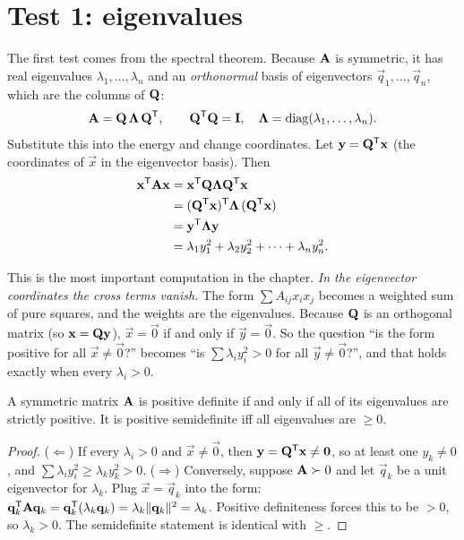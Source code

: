\section{Test 1: eigenvalues}

The first test comes from the spectral theorem. Because $\mathbf{A}$ is symmetric, it has real
eigenvalues $\lambda_1, \dots, \lambda_n$ and an \emph{orthonormal} basis of eigenvectors
$\vec{q}_1, \dots, \vec{q}_n$, which are the columns of $\mathbf{Q}$:
\[
  \mathbf{A} = \mathbf{Q}\,\mathbf{\Lambda}\,\mathbf{Q}^{\mathsf{T}}, \qquad
  \mathbf{Q}^{\mathsf{T}}\mathbf{Q} = \mathbf{I}, \quad \mathbf{\Lambda} = \operatorname{diag}(\lambda_1,\dots,\lambda_n).
\]
Substitute this into the energy and change coordinates. Let $\mathbf{y} = \mathbf{Q}^{\mathsf{T}}\mathbf{x}$ (the
coordinates of $\vec{x}$ in the eigenvector basis). Then
\begin{align*}
  \mathbf{x}^{\mathsf{T}}\mathbf{A}\mathbf{x}
  &= \mathbf{x}^{\mathsf{T}}\mathbf{Q}\mathbf{\Lambda}\mathbf{Q}^{\mathsf{T}}\mathbf{x} \\
  &= (\mathbf{Q}^{\mathsf{T}}\mathbf{x})^{\mathsf{T}} \mathbf{\Lambda}\, (\mathbf{Q}^{\mathsf{T}}\mathbf{x}) \\
  &= \mathbf{y}^{\mathsf{T}}\mathbf{\Lambda}\mathbf{y} \\
  &= \lambda_1 y_1^2 + \lambda_2 y_2^2 + \cdots + \lambda_n y_n^2.
\end{align*}

This is the most important computation in the chapter. \emph{In the eigenvector
coordinates the cross terms vanish.} The form $\sum A_{ij} x_i x_j$ becomes a weighted sum of pure
squares, and the weights are the eigenvalues. Because $\mathbf{Q}$ is an orthogonal matrix (so
$\mathbf{x} = \mathbf{Q}\mathbf{y}$), $\vec{x} = \vec{0}$ if and only if $\vec{y} = \vec{0}$. So the
question ``is the form positive for all $\vec{x}\neq\vec{0}$?'' becomes ``is $\sum \lambda_i y_i^2 >
0$ for all $\vec{y}\neq\vec{0}$?'', and that holds exactly when every $\lambda_i > 0$.

\begin{theorem}
\label{ch27:thm-eig}
A symmetric matrix $\mathbf{A}$ is positive definite if and only if all of its eigenvalues are
strictly positive. It is positive semidefinite iff all eigenvalues are $\geq 0$.
\end{theorem}

\begin{proof}
($\Leftarrow$) If every $\lambda_i > 0$ and $\vec{x}\neq\vec{0}$, then $\mathbf{y}=\mathbf{Q}^{\mathsf{T}}\mathbf{x}
\neq\mathbf{0}$, so at least one $y_k \neq 0$, and $\sum \lambda_i y_i^2 \geq \lambda_k y_k^2 > 0$.
($\Rightarrow$) Conversely, suppose $\mathbf{A}\succ 0$ and let $\vec{q}_k$ be a unit eigenvector for
$\lambda_k$. Plug $\vec{x} = \vec{q}_k$ into the form:
$\mathbf{q}_k^{\mathsf{T}}\mathbf{A}\mathbf{q}_k = \mathbf{q}_k^{\mathsf{T}}(\lambda_k\mathbf{q}_k) = \lambda_k \lVert\mathbf{q}_k\rVert^2 =
\lambda_k$. Positive definiteness forces this to be $>0$, so $\lambda_k > 0$. The semidefinite
statement is identical with $\geq$.
\end{proof}


